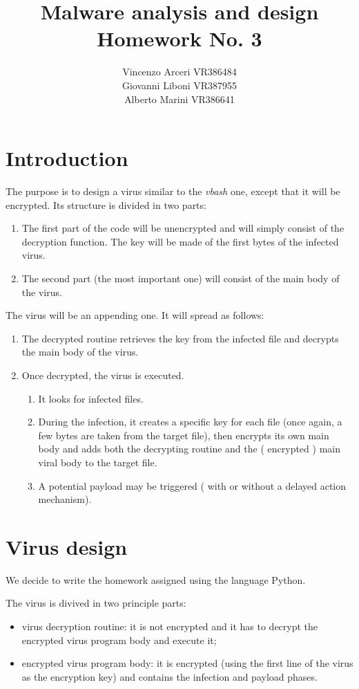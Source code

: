 \documentclass[a4paper,11pt]{article}
\begin{document}
\author{Vincenzo Arceri VR386484 \\ Giovanni Liboni VR387955 \\ Alberto Marini VR386641}
\title{Malware analysis and design \\ Homework No. 3}
\maketitle

\section{Introduction}
The purpose is to design a virus similar to the \textit{vbash} one, except that it will be encrypted. Its structure is divided in two parts:
\begin{enumerate}
\item The first part of the code will be unencrypted and will simply consist of the decryption function. The key will be made of the first bytes of the infected virus.
\item The second part (the most important one) will consist of the main body of the virus.
\end{enumerate}
The virus will be an appending one. It will spread as follows:
\begin{enumerate}
\item The decrypted routine retrieves the key from the infected file and decrypts the main body of the virus.
\item Once decrypted, the virus is executed.
\begin{enumerate}
\item It looks for infected files.
\item During the infection, it creates a specific key for each file (once again, a few bytes are taken from the target file), then encrypts its own main body and adds both the decrypting routine and the ( encrypted ) main viral body to the target file.
\item A potential payload may be triggered ( with or without a delayed action mechanism).
\end{enumerate}
\end{enumerate}
\section{Virus design}
We decide to write the homework assigned using the language Python.

The virus is divived in two principle parts:
\begin{itemize}
\item virus decryption routine: it is not encrypted and it has to decrypt the encrypted virus program body and execute it;
\item encrypted virus program body: it is encrypted (using the first line of the virus as the encryption key) and contains the infection and payload phases.
\end{itemize}
\end{document}
